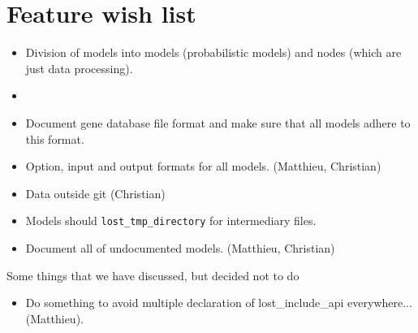 \documentclass{book}
\begin{document}
\section{Feature wish list}

\begin{itemize}

\item Division of models into models (probabilistic models) and nodes
  (which are just data processing).

\item 

\item Document gene database file format and make sure that all models
  adhere to this format.

\item Option, input and output formats for all models. (Matthieu, Christian)

\item Data outside git (Christian)

\item Models should \texttt{lost\_tmp\_directory} for intermediary
  files. 

\item Document all of undocumented models. (Matthieu, Christian)

\end{itemize}

Some things that we have discussed, but  decided not to do
\begin{itemize}
\item Do something to avoid multiple declaration of lost\_include\_api
 everywhere... (Matthieu).
\end{itemize}

\printindex
\end{document}

